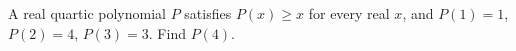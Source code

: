 A real quartic polynomial $P$ satisfies $P(x)\ge x$ for every real $x$, and $P(1)=1$, $P(2)=4$, $P(3)=3$. Find $P(4)$.
